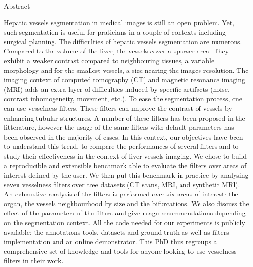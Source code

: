 \pagebreak

{Abstract}
\label{sec:abstract-diff}

Hepatic vessels segmentation in medical images is still an open problem. Yet, such segmentation is useful for praticians in a couple of contexts including surgical planning. The difficulties of hepatic vessels segmentation are numerous. Compared to the volume of the liver, the vessels cover a  sparser area. They exhibit a weaker contrast compared to neighbouring tissues, a variable morphology and for the smallest vessels, a size nearing the images resolution. The imaging context of computed tomography (CT) and magnetic resonance imaging (MRI) adds an extra layer of difficulties induced by specific artifacts (noise, contrast inhomogeneity, movement, etc.).
To ease the segmentation process, one can use vesselness filters. These filters can improve the contrast of vessels by enhancing tubular structures. A number of these filters has been proposed in the litterature, however the usage of the same filters with default parameters has been observed in the majority of cases. In this context, our objectives have been to understand this trend, to compare the performances of several filters and to study their effectiveness in the context of liver vessels imaging. We chose to build a reproducible and extensible benchmark able to evaluate the filters over areas of interest defined by the user. We then put this benchmark in practice by analysing seven vesselness filters over tree datasets (CT scans, MRI, and synthetic MRI). An exhaustive analysis of the filters is performed over six areas of interest: the organ, the vessels neighbourhood by size and the bifurcations. We also discuss the effect of the parameters of the filters and give usage recommendations depending on the segmentation context. All the code needed for our experiments is publicly available: the annotations tools, datasets and ground truth as well as filters implementation and an online demonstrator. This PhD thus regroups a comprehensive set of knowledge and tools for anyone looking to use vesselness filters in their work. 

